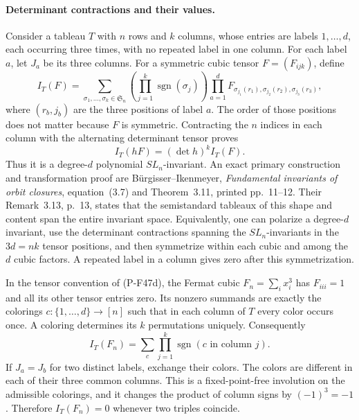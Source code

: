 \paragraph{Determinant contractions and their values.}
Consider a tableau $T$ with $n$ rows and $k$ columns,
whose entries are labels $1,\ldots,d$, each occurring
three times, with no repeated label in one column.
For each label $a$, let $J_a$ be its three columns.
For a symmetric cubic tensor $F=(F_{ijk})$, define
\[
 I_T(F)=\sum_{\sigma_1,\ldots,\sigma_k\in\mathfrak S_n}
       \left(\prod_{j=1}^k\operatorname{sgn}(\sigma_j)\right)
       \prod_{a=1}^d
       F_{\sigma_{j_1}(r_1),\sigma_{j_2}(r_2),
                                      \sigma_{j_3}(r_3)},
                                                        \tag{P-F47d}
\]
where $(r_b,j_b)$ are the three positions of label $a$.
The order of those positions does not matter because
$F$ is symmetric. Contracting the $n$ indices in each
column with the alternating determinant tensor proves
\[
                    I_T(hF)=(\det h)^k I_T(F).
                                                        \tag{P-F47e}
\]
Thus it is a degree-$d$ polynomial $SL_n$-invariant.
An exact primary construction and transformation proof
are B\"urgisser--Ikenmeyer, \emph{Fundamental invariants
of orbit closures}, equation~(3.7) and Theorem~3.11,
printed pp.~11--12. Their Remark~3.13, p.~13, states
that the semistandard tableaux of this shape and content
span the entire invariant space. Equivalently, one can
polarize a degree-$d$ invariant, use the determinant
contractions spanning the $SL_n$-invariants in the
$3d=nk$ tensor positions, and then symmetrize within
each cubic and among the $d$ cubic factors. A repeated
label in a column gives zero after this symmetrization.

In the tensor convention of (P-F47d), the Fermat cubic
$F_n=\sum_i x_i^3$ has $F_{iii}=1$ and all its other
tensor entries zero. Its nonzero summands are exactly
the colorings $c:\{1,\ldots,d\}\to[n]$ such that in
each column of $T$ every color occurs once. A coloring
determines its $k$ permutations uniquely. Consequently
\[
 I_T(F_n)=\sum_c\prod_{j=1}^k
                  \operatorname{sgn}(c\text{ in column }j).
                                                        \tag{P-F47f}
\]
If $J_a=J_b$ for two distinct labels, exchange their
colors. The colors are different in each of their
three common columns. This is a fixed-point-free
involution on the admissible colorings, and it changes
the product of column signs by $(-1)^3=-1$.
Therefore $I_T(F_n)=0$ whenever two triples coincide.

